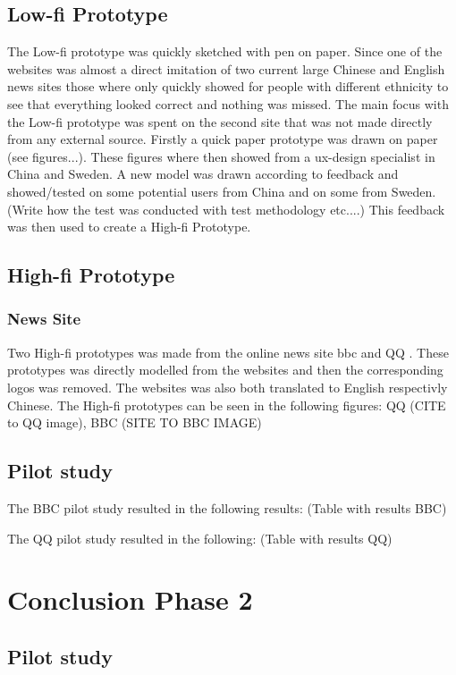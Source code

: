 \subsection{Low-fi Prototype}
The Low-fi prototype was quickly sketched with pen on paper. Since one of the websites was almost a direct imitation of two current large Chinese and English news sites those where only quickly showed for people with different ethnicity to see that everything looked correct and nothing was missed. The main focus with the Low-fi prototype was spent on the second site that was not made directly from any external source. Firstly a quick paper prototype was drawn on paper  (see figures...). These figures where then showed from a ux-design specialist in China and Sweden. A new model was drawn according to feedback and showed/tested on some potential users from China and on some from Sweden. (Write how the test was conducted with test methodology etc....) This feedback was then used to create a High-fi Prototype.

\subsection{High-fi Prototype}
\subsubsection{News Site}
Two High-fi prototypes was made from the online news site bbc \cite{bbc} and QQ \cite{qq_homepage}. These prototypes was directly modelled from the websites and then the corresponding logos was removed. The websites was also both translated to English respectivly Chinese. The High-fi prototypes can be seen in the following figures: QQ (CITE to QQ image), BBC (SITE TO BBC IMAGE)

\subsection{Pilot study}
The BBC pilot study resulted in the following results: (Table with results BBC)

The QQ pilot study resulted in the following: (Table with results QQ)



\section{Conclusion Phase 2}
\subsection{Pilot study}

